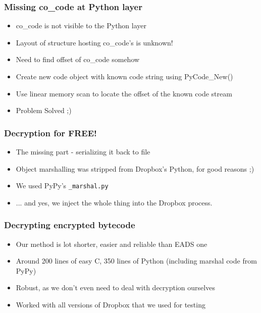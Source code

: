 \documentclass{beamer}
\newcommand\myfont{\fontsize{14}{20}\selectfont}
\begin{document}
\begin{frame}
\frametitle{Missing co\_code at Python layer}
\begin{itemize}
\itemsep 1.6em
\item{co\_code is not visible to the Python layer}
\item{Layout of structure hosting co\_code's is unknown!}
\item{Need to find offset of co\_code somehow}
\item{Create new code object with known code string using PyCode\_New()}
\item{Use linear memory scan to locate the offset of the known code stream}
\item{Problem Solved ;)}
\end{itemize}
\end{frame}

\begin{frame}
\frametitle{Decryption for FREE!}
\myfont
\begin{itemize}
\itemsep 1.5em
\item{The missing part - serializing it back to file }
\item{Object marshalling was stripped from Dropbox's Python, for good reasons ;)}
\item{We used PyPy's \texttt{\_marshal.py}}
\item{... and yes, we inject the whole thing into the Dropbox process.}
\end{itemize}
\end{frame}

\begin{frame}
\frametitle{Decrypting encrypted bytecode}
\myfont
\begin{itemize}
\itemsep 1em
\item{Our method is lot shorter, easier and reliable than EADS one}
\item{Around 200 lines of easy C, 350 lines of Python (including marshal code from PyPy)}
\item{Robust, as we don't even need to deal with decryption ourselves}
\item{Worked with all versions of Dropbox that we used for testing}
\end{itemize}
\end{frame}

\end{document}
